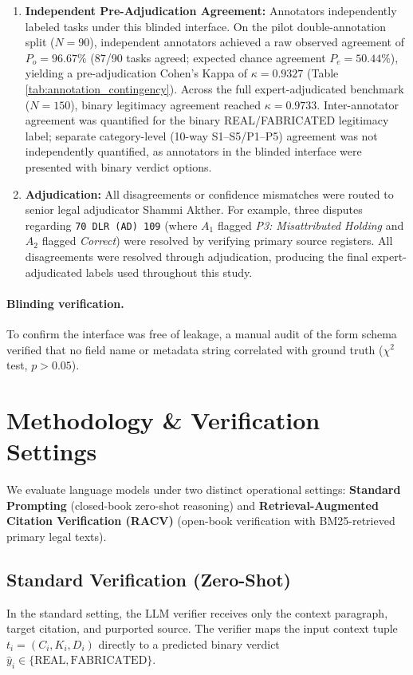 \documentclass[conference]{IEEEtran}
\begin{document}
\begin{enumerate}
\item \textbf{Independent Pre-Adjudication Agreement:} Annotators independently labeled tasks under this blinded interface. On the pilot double-annotation split ($N=90$), independent annotators achieved a raw observed agreement of $P_o = 96.67\%$ (87/90 tasks agreed; expected chance agreement $P_e = 50.44\%$), yielding a pre-adjudication Cohen's Kappa of $\kappa = 0.9327$ (Table \ref{tab:annotation_contingency}). Across the full expert-adjudicated benchmark ($N=150$), binary legitimacy agreement reached $\kappa = 0.9733$. Inter-annotator agreement was quantified for the binary REAL/FABRICATED legitimacy label; separate category-level (10-way S1--S5/P1--P5) agreement was not independently quantified, as annotators in the blinded interface were presented with binary verdict options.
\item \textbf{Adjudication:} All disagreements or confidence mismatches were routed to senior legal adjudicator Shammi Akther. For example, three disputes regarding \texttt{70 DLR (AD) 109} (where $A_1$ flagged \textit{P3: Misattributed Holding} and $A_2$ flagged \textit{Correct}) were resolved by verifying primary source registers. All disagreements were resolved through adjudication, producing the final expert-adjudicated labels used throughout this study.
\end{enumerate}

\paragraph{Blinding verification.} To confirm the interface was free of leakage, a manual audit of the form schema verified that no field name or metadata string correlated with ground truth ($\chi^2$ test, $p > 0.05$).

\section{Methodology \& Verification Settings}
We evaluate language models under two distinct operational settings: \textbf{Standard Prompting} (closed-book zero-shot reasoning) and \textbf{Retrieval-Augmented Citation Verification (RACV)} (open-book verification with BM25-retrieved primary legal texts).

\subsection{Standard Verification (Zero-Shot)}
In the standard setting, the LLM verifier receives only the context paragraph, target citation, and purported source. The verifier maps the input context tuple $t_i = (C_i, K_i, D_i)$ directly to a predicted binary verdict $\hat{y}_i \in \{\text{REAL}, \text{FABRICATED}\}$.
\end{document}
